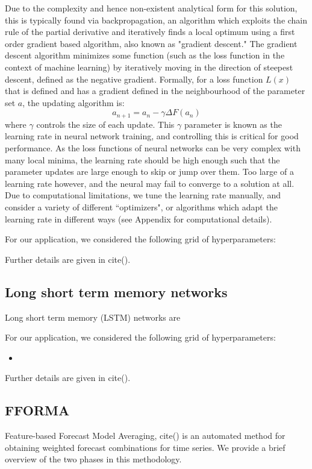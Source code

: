 \documentclass{article}
\begin{document}
Due to the complexity and hence non-existent analytical form for this solution, this is typically found via backpropagation, an algorithm which exploits the chain rule of the partial derivative and iteratively finds a local optimum using a first order gradient based algorithm, also known as "gradient descent." The gradient descent algorithm minimizes some function (such as the loss function in the context of machine learning) by iteratively moving in the direction of steepest descent, defined as the negative gradient. Formally, for a loss function $L(x)$ that is defined and has a gradient defined in the neighbourhood of the parameter set $a$, the updating algorithm is:
\begin{equation}
a_{n+1} = a_n - \gamma \Delta F(a_n)
\end{equation}
where $\gamma$ controls the size of each update. This $\gamma$ parameter is known as the learning rate in neural network training, and controlling this is critical for good performance. As the loss functions of neural networks can be very complex with many local minima, the learning rate should be high enough such that the parameter updates are large enough to skip or jump over them. Too large of a learning rate however, and the neural may fail to converge to a solution at all. Due to computational limitations, we tune the learning rate manually, and consider a variety of different ``optimizers", or algorithms which adapt the learning rate in different ways (see Appendix for computational details).

For our application, we considered the following grid of hyperparameters:

Further details are given in cite().

\subsection{Long short term memory networks}
Long short term memory (LSTM) networks are 

For our application, we considered the following grid of hyperparameters:

\begin{itemize}
	\item 
\end{itemize}

Further details are given in cite().

\subsection{FFORMA}
Feature-based Forecast Model Averaging, cite() is an automated method for obtaining weighted forecast combinations for time series. We provide a brief overview of the two phases in this methodology.
\end{document}

